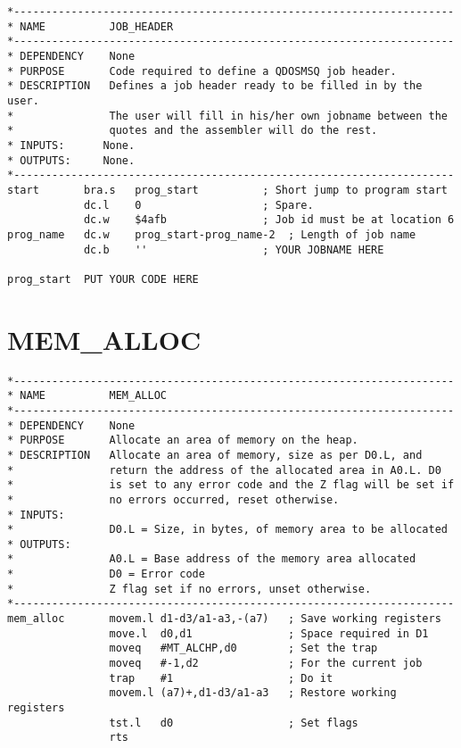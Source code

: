 \begin{lstlisting}[firstnumber=1,caption={JOB\_HEADER}]
*---------------------------------------------------------------------
* NAME          JOB_HEADER
*---------------------------------------------------------------------
* DEPENDENCY    None
* PURPOSE       Code required to define a QDOSMSQ job header.
* DESCRIPTION   Defines a job header ready to be filled in by the user.
*               The user will fill in his/her own jobname between the 
*               quotes and the assembler will do the rest.
* INPUTS:      None.
* OUTPUTS:     None.
*---------------------------------------------------------------------
start       bra.s   prog_start          ; Short jump to program start
            dc.l    0                   ; Spare. 
            dc.w    $4afb               ; Job id must be at location 6
prog_name   dc.w    prog_start-prog_name-2  ; Length of job name
            dc.b    ''                  ; YOUR JOBNAME HERE

prog_start  PUT YOUR CODE HERE
\end{lstlisting}

\section{MEM\_ALLOC}
\label{ch9-MEM_ALLOC}%

\begin{lstlisting}[firstnumber=1,caption={MEM\_ALLOC}]
*---------------------------------------------------------------------
* NAME          MEM_ALLOC
*---------------------------------------------------------------------
* DEPENDENCY    None
* PURPOSE       Allocate an area of memory on the heap.
* DESCRIPTION   Allocate an area of memory, size as per D0.L, and
*               return the address of the allocated area in A0.L. D0 
*               is set to any error code and the Z flag will be set if
*               no errors occurred, reset otherwise.
* INPUTS:
*               D0.L = Size, in bytes, of memory area to be allocated
* OUTPUTS:
*               A0.L = Base address of the memory area allocated
*               D0 = Error code
*               Z flag set if no errors, unset otherwise.
*---------------------------------------------------------------------
mem_alloc       movem.l d1-d3/a1-a3,-(a7)   ; Save working registers
                move.l  d0,d1               ; Space required in D1
                moveq   #MT_ALCHP,d0        ; Set the trap
                moveq   #-1,d2              ; For the current job
                trap    #1                  ; Do it
                movem.l (a7)+,d1-d3/a1-a3   ; Restore working registers
                tst.l   d0                  ; Set flags
                rts
\end{lstlisting}

